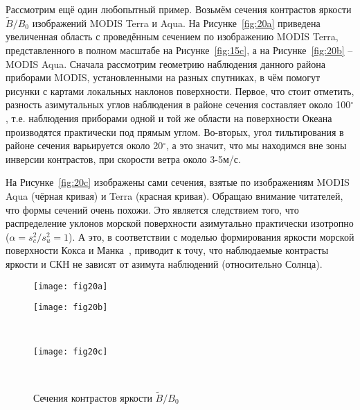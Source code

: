 Рассмотрим ещё один любопытный пример. Возьмём сечения контрастов яркости $\tilde{B}/B_{0}$ изображений MODIS Terra и Aqua. На Рисунке~\ref{fig:20a} приведена увеличенная область с проведённым сечением по изображению MODIS Terra, представленного в полном масштабе на Рисунке~\ref{fig:15c},  а на Рисунке~\ref{fig:20b} --  MODIS Aqua. Сначала рассмотрим геометрию наблюдения данного района приборами MODIS, установленными на разных спутниках, в чём помогут рисунки с картами локальных наклонов поверхности. Первое, что стоит отметить, разность азимутальных углов наблюдения в районе сечения составляет около 100${}^\circ$, т.е. наблюдения приборами одной и той же области на поверхности Океана производятся практически под прямым углом. Во-вторых, угол тильтирования в районе сечения варьируется около 20${}^\circ$, а это значит, что мы находимся вне зоны инверсии контрастов, при скорости ветра около 3-5м/с.

На Рисунке~\ref{fig:20c} изображены сами сечения, взятые по изображениям MODIS Aqua (чёрная кривая) и Terra (красная кривая). Обращаю внимание читателей, что формы сечений очень похожи. Это является следствием того, что распределение уклонов морской поверхности азимутально практически изотропно ($\alpha =s_{c}^{2} /s_{u}^{2} =1$). А это, в соответствии с моделью формирования яркости морской поверхности Кокса и Манка~\citep{Cox1954}, приводит к точу, что наблюдаемые контрасты яркости и СКН не зависят от азимута наблюдений (относительно Солнца).



\begin{figure}[!h]
    	\centering
	\begin{minipage}{.47\textwidth}
	    \subcaptionbox{\label{fig:20a}}
		{\texttt{[image: fig20a]}}
	\end{minipage}
	\hfill
	\begin{minipage}{.47\textwidth}
	    \subcaptionbox{\label{fig:20b}}
		{\texttt{[image: fig20b]}}
	\end{minipage}
	\hfill
	\\
	\begin{minipage}{.47\textwidth}
	    \subcaptionbox{\label{fig:20c}}
		{\texttt{[image: fig20c]}}
	\end{minipage}
	\\
    \caption{Сечения контрастов яркости $\tilde{B}/B_{0}$}
    \label{fig:20}
\end{figure}


